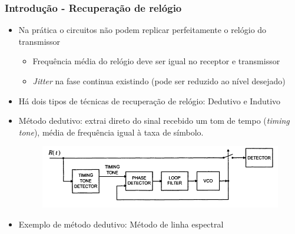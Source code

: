 \begin{frame}
	\frametitle{Introdução - Recuperação de relógio}
	
	\begin{itemize}
		\item Na prática o circuitos não podem replicar perfeitamente o relógio do transmissor		
		\begin{itemize}
			\item Frequência média do relógio deve ser igual no receptor e transmissor
			\item \textit{Jitter} na fase continua existindo (pode ser reduzido ao nível desejado)
		\end{itemize}
		\item Há dois tipos de técnicas de recuperação de relógio: Dedutivo e Indutivo
		\item Método dedutivo: extrai direto do sinal recebido um tom de tempo (\textit{timing tone}), média de frequência igual à taxa de símbolo.
		\begin{figure}
			\centering
			\includegraphics[width=.8\textwidth]{figs/metodo_dedutivo}
		\end{figure}
		\item Exemplo de método dedutivo: Método de linha espectral
		
	\end{itemize}			
\end{frame}

